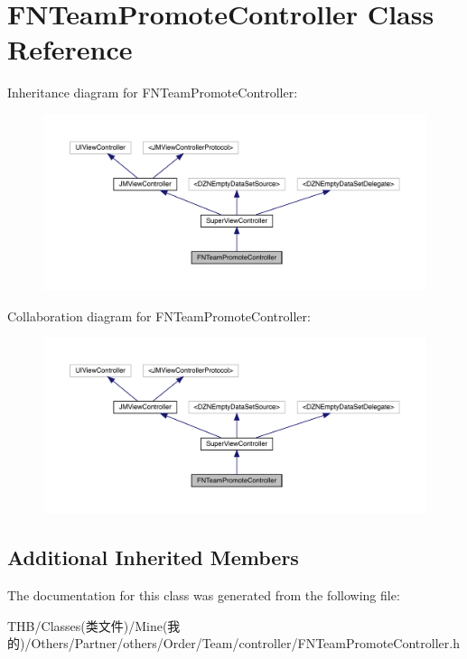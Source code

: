\hypertarget{interface_f_n_team_promote_controller}{}\section{F\+N\+Team\+Promote\+Controller Class Reference}
\label{interface_f_n_team_promote_controller}


Inheritance diagram for F\+N\+Team\+Promote\+Controller\+:\nopagebreak
\begin{figure}[H]
\begin{center}
\leavevmode
\includegraphics[width=350pt]{interface_f_n_team_promote_controller__inherit__graph}
\end{center}
\end{figure}


Collaboration diagram for F\+N\+Team\+Promote\+Controller\+:\nopagebreak
\begin{figure}[H]
\begin{center}
\leavevmode
\includegraphics[width=350pt]{interface_f_n_team_promote_controller__coll__graph}
\end{center}
\end{figure}
\subsection*{Additional Inherited Members}


The documentation for this class was generated from the following file\+:\begin{DoxyCompactItemize}
\item 
T\+H\+B/\+Classes(类文件)/\+Mine(我的)/\+Others/\+Partner/others/\+Order/\+Team/controller/F\+N\+Team\+Promote\+Controller.\+h\end{DoxyCompactItemize}
